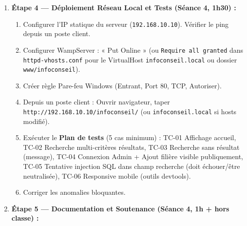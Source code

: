 \documentclass[11pt]{article}
\begin{document}
\begin{enumerate}
\begin{enumerate}
        \item Page \textbf{Recherche} (\texttt{recherche.php}) : Formulaire GET (select établissement, select domaine, select niveau, bouton « Filtrer »). Affichage résultats en tableau responsive (cartes sur mobile) : Nom filière, Établissement, Domaine, Niveau, Bouton « Détail » (\texttt{detail.php?id=...}).
        \item Page \textbf{Détail} (\texttt{detail.php}) : Infos complètes (description, conditions admission, débouchés, contact établissement, lien site web).
        \item Espace \textbf{Admin} (\texttt{admin/login.php}, \texttt{admin/dashboard.php}, \texttt{admin/filiere\_form.php}) : Authentification session, CRUD complet sur \texttt{filiere} (ajout, modif, suppression avec confirmation JS).
        \item CSS : Variables CSS pour couleurs, Flexbox/Grid, Media queries (\texttt{@media (max-width: 768px)}).
    \end{enumerate}
    \item \textbf{Étape 4 — Déploiement Réseau Local et Tests (Séance 4, 1h30) :}
    \begin{enumerate}
        \item Configurer l'IP statique du serveur (\texttt{192.168.10.10}). Vérifier le ping depuis un poste client.
        \item Configurer WampServer : « Put Online » (ou \texttt{Require all granted} dans \texttt{httpd-vhosts.conf} pour le VirtualHost \texttt{infoconseil.local} ou dossier \texttt{www/infoconseil}).
        \item Créer règle Pare-feu Windows (Entrant, Port 80, TCP, Autoriser).
        \item Depuis un poste client : Ouvrir navigateur, taper \texttt{http://192.168.10.10/infoconseil/} (ou \texttt{infoconseil.local} si hosts modifié).
        \item Exécuter le \textbf{Plan de tests} (5 cas minimum) : TC-01 Affichage accueil, TC-02 Recherche multi-critères résultats, TC-03 Recherche sans résultat (message), TC-04 Connexion Admin + Ajout filière visible publiquement, TC-05 Tentative injection SQL dans champ recherche (doit échouer/être neutralisée), TC-06 Responsive mobile (outils devtools).
        \item Corriger les anomalies bloquantes.
    \end{enumerate}
    \item \textbf{Étape 5 — Documentation et Soutenance (Séance 4, 1h + hors classe) :}

\end{enumerate}
\end{document}
